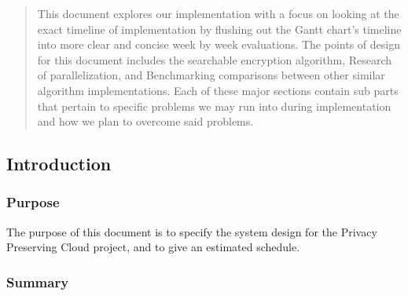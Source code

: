 \begin{titlepage}
\begin{singlespace}
{{                \NameSigPair{\GroupMemberThree}\par
            }
            \vspace{20pt}
        }
        \begin{abstract}
        	 This document explores our implementation with a focus on looking at the exact timeline of implementation by flushing out the Gantt chart's timeline into more clear and concise week by week evaluations. The points of design for this document includes the searchable encryption algorithm, Research of parallelization, and Benchmarking comparisons between other similar algorithm implementations. Each of these major sections contain sub parts that pertain to specific problems we may run into during implementation and how we plan to overcome said problems.
        \end{abstract}     
    \end{singlespace}
\end{titlepage}
\newpage
{}


\subsection{Introduction}

\subsubsection{ Purpose }

The purpose of this document is to specify the system design for the Privacy Preserving Cloud project, and to give an estimated schedule.


\subsubsection{ Summary }





